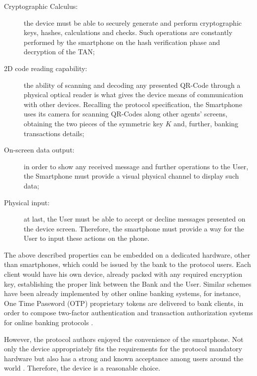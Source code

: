 \begin{description}
  \item[Cryptographic Calculus:] the device must be able to securely generate and perform cryptographic keys, hashes, calculations and checks. Such operations are constantly performed by the smartphone on the hash verification phase and decryption of the TAN;

  \item[2D code reading capability:] the ability of scanning and decoding any presented QR-Code through a physical optical reader is what gives the device means of communication with other devices. Recalling the protocol specification, the Smartphone uses its camera for scanning QR-Codes along other agents' screens, obtaining the two pieces of the symmetric key $K$ and, further, banking transactions details;

  \item[On-screen data output:] in order to show any received message and further operations to the User, the Smartphone must provide a visual physical channel to display such data;

  \item[Physical input:] at last, the User must be able to accept or decline messages presented on the device screen. Therefore, the smartphone must provide a way for the User to input these actions on the phone.
\end{description}

The above described properties can be embedded on a dedicated hardware, other than smartphones, which could be issued by the bank to the protocol users. Each client would have his own device, already packed with any required encryption key, establishing the proper link between the Bank and the User. Similar schemes have been already implemented by other online banking systems, for instance, One Time Password (OTP) proprietary tokens are delivered to bank clients, in order to compose two-factor authentication and transaction authorization systems for online banking protocols \cite{Bonneau2012, Claessens2002}.

However, the protocol authors enjoyed the convenience of the smartphone. Not only the device appropriately fits the requirements for the protocol mandatory hardware but also has a strong and known acceptance among users around the world \cite{NewzooReport2018}. Therefore, the device is a reasonable choice.



